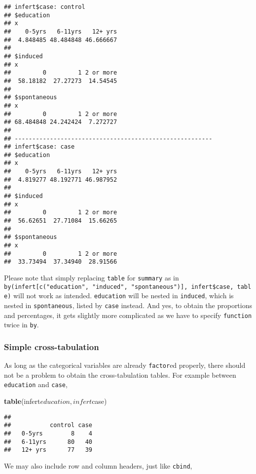 \documentclass[]{book}
\newenvironment{Shaded}{\begin{snugshade}}{\end{snugshade}}
\newcommand{\KeywordTok}[1]{\textcolor[rgb]{0.13,0.29,0.53}{\textbf{{#1}}}}
\newcommand{\DataTypeTok}[1]{\textcolor[rgb]{0.13,0.29,0.53}{{#1}}}
\newcommand{\NormalTok}[1]{{#1}}
\theoremstyle{definition}
\theoremstyle{definition}
\theoremstyle{remark}
\begin{document}
\begin{verbatim}
## infert$case: control
## $education
## x
##    0-5yrs   6-11yrs   12+ yrs 
##  4.848485 48.484848 46.666667 
## 
## $induced
## x
##         0         1 2 or more 
##  58.18182  27.27273  14.54545 
## 
## $spontaneous
## x
##         0         1 2 or more 
## 68.484848 24.242424  7.272727 
## 
## -------------------------------------------------------- 
## infert$case: case
## $education
## x
##    0-5yrs   6-11yrs   12+ yrs 
##  4.819277 48.192771 46.987952 
## 
## $induced
## x
##         0         1 2 or more 
##  56.62651  27.71084  15.66265 
## 
## $spontaneous
## x
##         0         1 2 or more 
##  33.73494  37.34940  28.91566
\end{verbatim}

Please note that simply replacing \texttt{table} for \texttt{summary} as
in
\texttt{by(infert{[}c("education",\ "induced",\ "spontaneous"){]},\ infert\$case,\ table)}
will not work as intended. \texttt{education} will be nested in
\texttt{induced}, which is nested in \texttt{spontaneous}, listed by
\texttt{case} instead. And yes, to obtain the proportions and
percentages, it gets slightly more complicated as we have to specify
\texttt{function} twice in \texttt{by}.

\subsubsection{Simple cross-tabulation}\label{simple-cross-tabulation}

As long as the categorical variables are already \texttt{factor}ed
properly, there should not be a problem to obtain the cross-tabulation
tables. For example between \texttt{education} and \texttt{case},

\begin{Shaded}
\begin{Highlighting}[]
\KeywordTok{table}\NormalTok{(infert$education, infert$case)}
\end{Highlighting}
\end{Shaded}

\begin{verbatim}
##          
##           control case
##   0-5yrs        8    4
##   6-11yrs      80   40
##   12+ yrs      77   39
\end{verbatim}

We may also include row and column headers, just like \texttt{cbind},

\begin{Shaded}
\end{Shaded}
\end{document}
